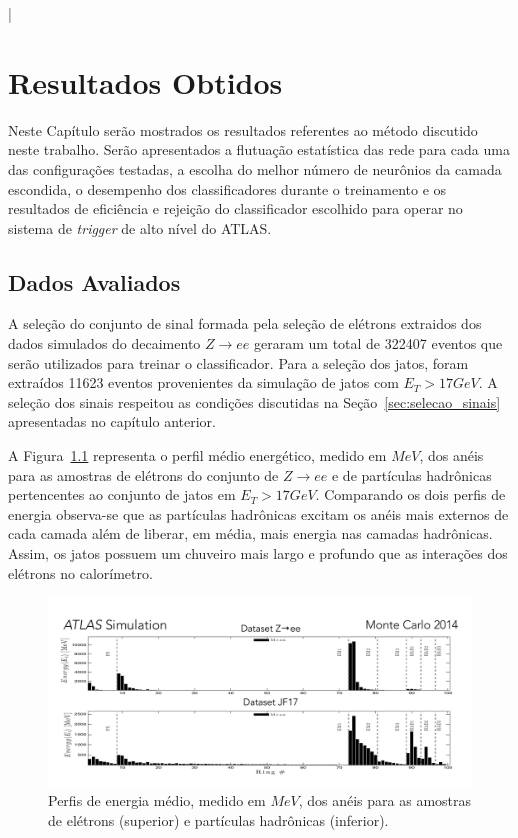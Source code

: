 |

\chapter{Resultados Obtidos}
\label{cap:resultados}
\glsresetall

Neste Capítulo serão mostrados os resultados referentes ao método discutido neste trabalho. Serão
apresentados a flutuação estatística das rede para cada uma das configurações testadas, a escolha do melhor número
de neurônios da camada escondida, o desempenho dos classificadores durante o treinamento e os resultados de 
eficiência e rejeição do classificador escolhido para operar no sistema de \textit{trigger} de alto nível do ATLAS.

\section{Dados Avaliados}

A seleção do conjunto de sinal formada pela seleção de elétrons extraidos dos dados simulados do decaimento $Z \rightarrow ee$ geraram
um total de 322407 eventos que serão utilizados para treinar o classificador. Para a seleção dos jatos, foram extraídos 11623 eventos
provenientes da simulação de jatos com $E_{T} > 17 GeV$. A seleção dos sinais respeitou as condições discutidas na Seção~\ref{sec:selecao_sinais} 
apresentadas no capítulo anterior. 

A Figura~\ref{fig:perfil_ringer} representa o perfil médio energético, medido em $MeV$, dos anéis para as amostras de elétrons do conjunto de $Z\rightarrow ee$ e de partículas hadrônicas pertencentes 
ao conjunto de jatos em $E_{T}>17 GeV$. Comparando os dois perfis de energia observa-se que as partículas hadrônicas excitam os anéis mais externos de cada camada além de liberar, em média, 
mais energia nas camadas hadrônicas. Assim, os jatos possuem um chuveiro mais largo e profundo que as interações dos elétrons no calorímetro. 

\begin{figure}[h!t]
\centering
\includegraphics[width=1\textwidth]{figures/plots/ringerShape.pdf}
\caption[Perfil de energia médio para os anéis nas amostras de elétrons e jatos]
{Perfis de energia médio, medido em $MeV$, dos anéis para as amostras de elétrons (superior) e partículas hadrônicas (inferior).}
\label{fig:perfil_ringer}
\end{figure}


